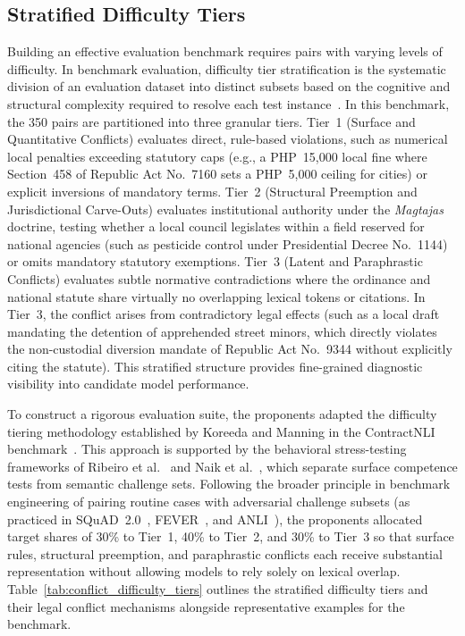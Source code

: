     \subsection{Stratified Difficulty Tiers}
    \label{sec:difficulty_tiers}
    Building an effective evaluation benchmark requires pairs with varying levels of difficulty. In benchmark evaluation, difficulty tier stratification is the systematic division of an evaluation dataset into distinct subsets based on the cognitive and structural complexity required to resolve each test instance~\cite{koreeda2021contract, ribeiro2020beyond}. In this benchmark, the 350 pairs are partitioned into three granular tiers. Tier~1 (Surface and Quantitative Conflicts) evaluates direct, rule-based violations, such as numerical local penalties exceeding statutory caps (e.g., a PHP~15,000 local fine where Section~458 of Republic Act No.~7160 sets a PHP~5,000 ceiling for cities) or explicit inversions of mandatory terms. Tier~2 (Structural Preemption and Jurisdictional Carve-Outs) evaluates institutional authority under the \textit{Magtajas} doctrine, testing whether a local council legislates within a field reserved for national agencies (such as pesticide control under Presidential Decree No.~1144) or omits mandatory statutory exemptions. Tier~3 (Latent and Paraphrastic Conflicts) evaluates subtle normative contradictions where the ordinance and national statute share virtually no overlapping lexical tokens or citations. In Tier~3, the conflict arises from contradictory legal effects (such as a local draft mandating the detention of apprehended street minors, which directly violates the non-custodial diversion mandate of Republic Act No.~9344 without explicitly citing the statute). This stratified structure provides fine-grained diagnostic visibility into candidate model performance.

    To construct a rigorous evaluation suite, the proponents adapted the difficulty tiering methodology established by Koreeda and Manning in the ContractNLI benchmark~\cite{koreeda2021contract}. This approach is supported by the behavioral stress-testing frameworks of Ribeiro et al.~\cite{ribeiro2020beyond} and Naik et al.~\cite{naik2018stress}, which separate surface competence tests from semantic challenge sets. Following the broader principle in benchmark engineering of pairing routine cases with adversarial challenge subsets (as practiced in SQuAD~2.0~\cite{rajpurkar2018know}, FEVER~\cite{thorne2018fever}, and ANLI~\cite{nie2020anli}), the proponents allocated target shares of 30\% to Tier~1, 40\% to Tier~2, and 30\% to Tier~3 so that surface rules, structural preemption, and paraphrastic conflicts each receive substantial representation without allowing models to rely solely on lexical overlap. Table~\ref{tab:conflict_difficulty_tiers} outlines the stratified difficulty tiers and their legal conflict mechanisms alongside representative examples for the benchmark.

